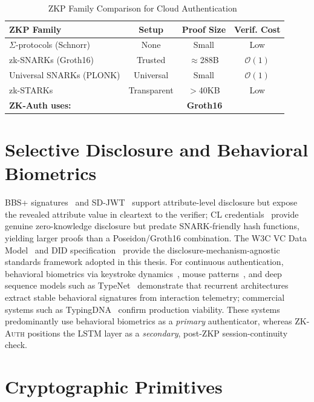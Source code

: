 \documentclass[12pt,a4paper,oneside]{report}
\begin{document}
\begin{table}[H]
\renewcommand{\arraystretch}{1.2}
\caption{ZKP Family Comparison for Cloud Authentication~\cite{dandge2025zkpcloud}}
\label{tab:zkp_families}
\centering
\scriptsize
\begin{tabular}{lccc}
\toprule
\textbf{ZKP Family} & \textbf{Setup} & \textbf{Proof Size} & \textbf{Verif. Cost} \\
\midrule
$\Sigma$-protocols (Schnorr) & None    & Small         & Low \\
zk-SNARKs (Groth16)          & Trusted & $\approx$288B & $\mathcal{O}(1)$ \\
Universal SNARKs (PLONK)     & Universal & Small       & $\mathcal{O}(1)$ \\
zk-STARKs                    & Transparent & $>$40KB   & Low \\
\midrule
\textbf{ZK-Auth uses:} & \multicolumn{3}{c}{\textbf{Groth16}} \\
\bottomrule
\end{tabular}
\end{table}

\section{Selective Disclosure and Behavioral Biometrics}

BBS+ signatures~\cite{bbs} and SD-JWT~\cite{sdjwt} support attribute-level
disclosure but expose the revealed attribute value in cleartext to the
verifier; CL credentials~\cite{cl} provide genuine zero-knowledge
disclosure but predate SNARK-friendly hash functions, yielding larger
proofs than a Poseidon/Groth16 combination. The W3C VC Data
Model~\cite{w3cvc} and DID specification~\cite{w3cdid} provide the
disclosure-mechanism-agnostic standards framework adopted in this thesis.
For continuous authentication, behavioral biometrics via keystroke
dynamics~\cite{shepherd95}, mouse patterns~\cite{nakkabi11}, and deep
sequence models such as TypeNet~\cite{typenet} demonstrate that recurrent
architectures extract stable behavioral signatures from interaction
telemetry; commercial systems such as TypingDNA~\cite{typingdna} confirm
production viability. These systems predominantly use behavioral
biometrics as a \textit{primary} authenticator, whereas \textsc{ZK-Auth}
positions the LSTM layer as a \textit{secondary}, post-ZKP
session-continuity check.

\section{Cryptographic Primitives}
\end{document}
